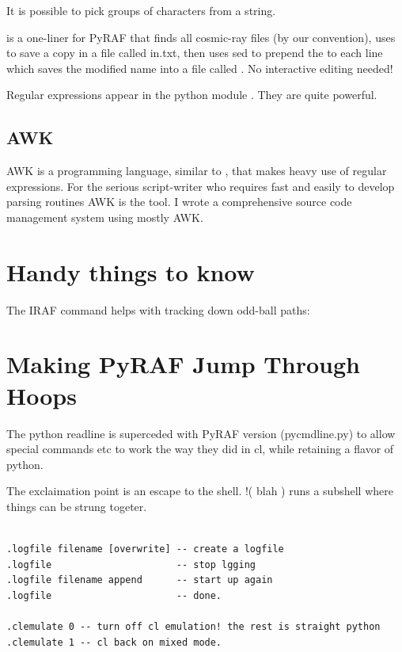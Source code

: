 It is possible to pick groups of characters from a string.

{\color{verbcolor}{\verb#!ls -1 c_*fits | tee in.list | sed -e 's/^/c_/' > out.list#}}

is a one-liner for PyRAF that finds all cosmic-ray files (by our
convention), uses {\color{verbcolor}{\verb#tee#}} to save a copy in a
file called in.txt, then uses sed to prepend the
{\color{verbcolor}{\verb#c_#}} to each line which saves the modified
name into a file called {\color{verbcolor}{\verb#out.list#}}.  No
interactive editing needed!

Regular expressions appear in the python module {\color{verbcolor}{\verb#re#}}.
They are quite powerful.

\subsection{AWK}

AWK is a programming language, similar to {\color{verbcolor}{\verb#lex#}},
that makes heavy use of regular expressions. For the serious script-writer
who requires fast and easily to develop parsing routines AWK is the tool.
I wrote a comprehensive source code management system using mostly AWK.

\section{Handy things to know}

The IRAF command {\color{verbcolor}{\verb#envget('param')#}} helps
with tracking down odd-ball paths:

\section{Making PyRAF Jump Through Hoops}

The python readline is superceded with PyRAF version (pycmdline.py) to allow
special commands etc to work the way they did in cl, while
retaining a flavor of python.

The exclaimation point is an escape to the shell.
!( blah ) runs a subshell where things can be strung togeter.

\begingroup \fontsize{10pt}{10pt}
\selectfont
\begin{verbatim} 

.logfile filename [overwrite] -- create a logfile
.logfile                      -- stop lgging
.logfile filename append      -- start up again
.logfile                      -- done.

.clemulate 0 -- turn off cl emulation! the rest is straight python
.clemulate 1 -- cl back on mixed mode.
\end{verbatim}
\endgroup

